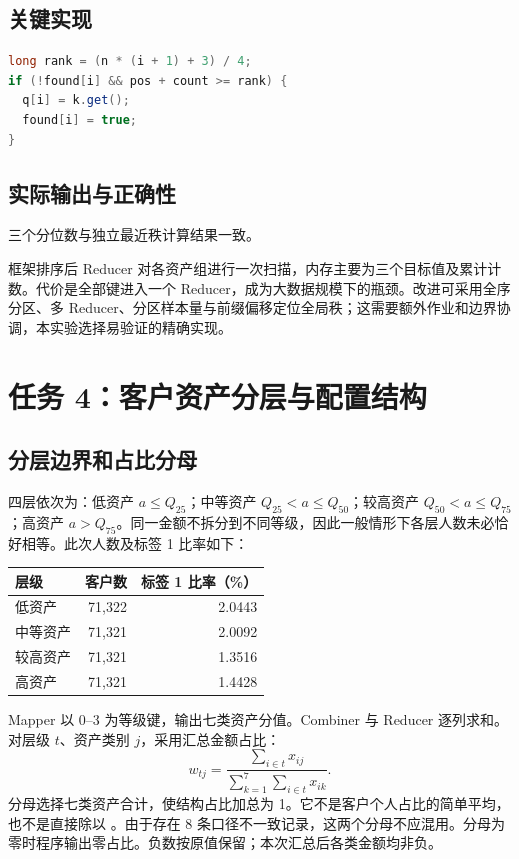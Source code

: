 \documentclass[UTF8,a4paper,zihao=5,fontset=none]{ctexart}
\newcommand{\code}[1]{\texttt{\detokenize{#1}}}
\begin{document}
\subsection{关键实现}
\begin{lstlisting}[language=Java]
long rank = (n * (i + 1) + 3) / 4;
if (!found[i] && pos + count >= rank) {
  q[i] = k.get();
  found[i] = true;
}
\end{lstlisting}

\subsection{实际输出与正确性}

三个分位数与独立最近秩计算结果一致。

框架排序后 Reducer 对各资产组进行一次扫描，内存主要为三个目标值及累计计数。代价是全部键进入一个 Reducer，成为大数据规模下的瓶颈。改进可采用全序分区、多 Reducer、分区样本量与前缀偏移定位全局秩；这需要额外作业和边界协调，本实验选择易验证的精确实现。

\section{任务 4：客户资产分层与配置结构}
\subsection{分层边界和占比分母}
四层依次为：低资产 $a\leq Q_{25}$；中等资产 $Q_{25}<a\leq Q_{50}$；较高资产 $Q_{50}<a\leq Q_{75}$；高资产 $a>Q_{75}$。同一金额不拆分到不同等级，因此一般情形下各层人数未必恰好相等。此次人数及标签 1 比率如下：
\begin{table}[H]\centering
\begin{tabular}{l r r}\toprule 层级 & 客户数 & 标签 1 比率（\%）\\\midrule
低资产 & 71,322 & 2.0443\\
中等资产 & 71,321 & 2.0092\\
较高资产 & 71,321 & 1.3516\\
高资产 & 71,321 & 1.4428\\\bottomrule\end{tabular}
\end{table}
Mapper 以 0--3 为等级键，输出七类资产分值。Combiner 与 Reducer 逐列求和。对层级 $t$、资产类别 $j$，采用汇总金额占比：
\[
 w_{tj}=\frac{\sum_{i\in t}x_{ij}}{\sum_{k=1}^{7}\sum_{i\in t}x_{ik}}.
\]
分母选择七类资产合计，使结构占比加总为 1。它不是客户个人占比的简单平均，也不是直接除以 \code{CUST_ASSET_AMT}。由于存在 8 条口径不一致记录，这两个分母不应混用。分母为零时程序输出零占比。负数按原值保留；本次汇总后各类金额均非负。
\end{document}
